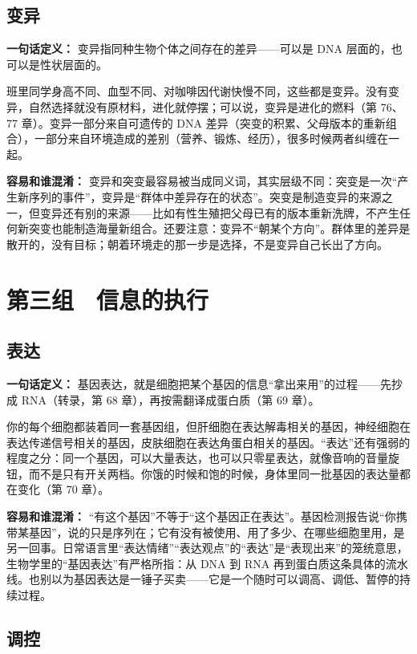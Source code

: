 \subsection{变异}

\textbf{一句话定义：} 变异指同种生物个体之间存在的差异——可以是 DNA 层面的，也可以是性状层面的。

班里同学身高不同、血型不同、对咖啡因代谢快慢不同，这些都是变异。没有变异，自然选择就没有原材料，进化就停摆；可以说，变异是进化的燃料（第 76、77 章）。变异一部分来自可遗传的 DNA 差异（突变的积累、父母版本的重新组合），一部分来自环境造成的差别（营养、锻炼、经历），很多时候两者纠缠在一起。

\textbf{容易和谁混淆：} 变异和突变最容易被当成同义词，其实层级不同：突变是一次“产生新序列的事件”，变异是“群体中差异存在的状态”。突变是制造变异的来源之一，但变异还有别的来源——比如有性生殖把父母已有的版本重新洗牌，不产生任何新突变也能制造海量新组合。还要注意：变异不“朝某个方向”。群体里的差异是散开的，没有目标；朝着环境走的那一步是选择，不是变异自己长出了方向。

\section{第三组　信息的执行}

\subsection{表达}

\textbf{一句话定义：} 基因表达，就是细胞把某个基因的信息“拿出来用”的过程——先抄成 RNA（转录，第 68 章），再按需翻译成蛋白质（第 69 章）。

你的每个细胞都装着同一套基因组，但肝细胞在表达解毒相关的基因，神经细胞在表达传递信号相关的基因，皮肤细胞在表达角蛋白相关的基因。“表达”还有强弱的程度之分：同一个基因，可以大量表达，也可以只零星表达，就像音响的音量旋钮，而不是只有开关两档。你饿的时候和饱的时候，身体里同一批基因的表达量都在变化（第 70 章）。

\textbf{容易和谁混淆：} “有这个基因”不等于“这个基因正在表达”。基因检测报告说“你携带某基因”，说的只是序列在；它有没有被使用、用了多少、在哪些细胞里用，是另一回事。日常语言里“表达情绪”“表达观点”的“表达”是“表现出来”的笼统意思，生物学里的“基因表达”有严格所指：从 DNA 到 RNA 再到蛋白质这条具体的流水线。也别以为基因表达是一锤子买卖——它是一个随时可以调高、调低、暂停的持续过程。

\subsection{调控}

